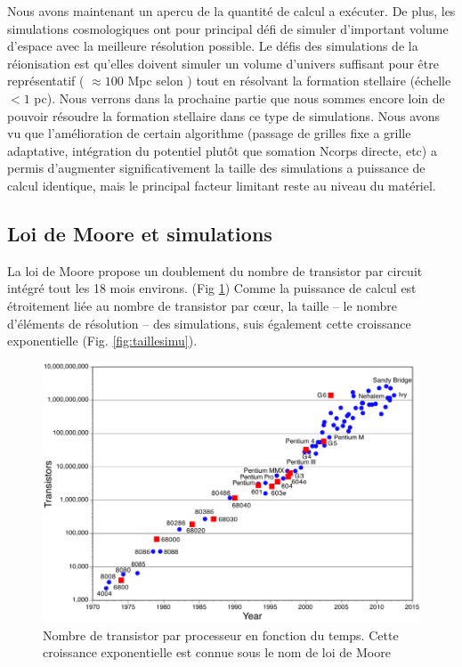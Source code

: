 Nous avons maintenant un apercu de la quantité de calcul a exécuter.
De plus, les simulations cosmologiques ont pour principal défi de simuler d'important volume d'espace avec la meilleure résolution possible.
Le défis des simulations de la réionisation est qu'elles doivent simuler un volume d'univers suffisant pour être représentatif ( $\approx 100$ Mpc selon \cite{iliev_cosmological_2006}) tout en résolvant la formation stellaire (échelle $<1$ pc).
Nous verrons dans la prochaine partie que nous sommes encore loin de pouvoir résoudre la formation stellaire dans ce type de simulations. %
Nous avons vu que l'amélioration de certain algorithme (passage de grilles fixe a grille adaptative, intégration du potentiel plutôt que somation Ncorps directe, etc) a permis d'augmenter significativement la taille des simulations a puissance de calcul identique, mais le principal facteur limitant reste au niveau du matériel.

\subsection{Loi de Moore et simulations}
La loi de Moore \citep{moore1965cramming} propose un doublement du nombre de transistor par circuit intégré tout les 18 mois environs. (Fig \ref{fig:moore})
Comme la puissance de calcul est étroitement liée au nombre de transistor par cœur, la taille -- le nombre d'éléments de résolution -- des simulations, suis également cette croissance exponentielle (Fig. \ref{fig:taillesimu}).

\begin{figure}[bth]
        \includegraphics[width=.95\linewidth]{img/02/moorelaw.png} 
        \caption{Nombre de transistor par processeur en fonction du temps.
        Cette croissance exponentielle est connue sous le nom de loi de Moore}
 		\label{fig:moore}
\end{figure}

